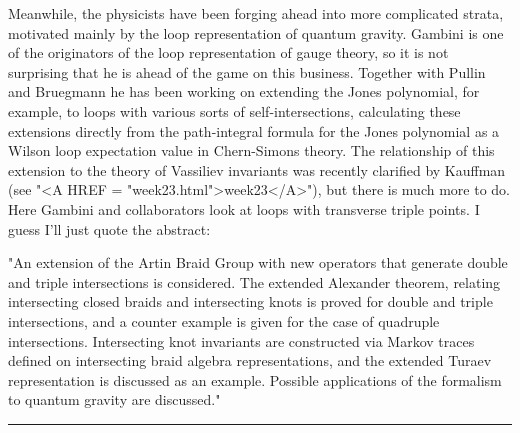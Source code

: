 Meanwhile, the physicists have been forging ahead into more complicated
strata, motivated mainly by the loop representation of quantum gravity.
Gambini is one of the originators of the loop representation of gauge
theory, so it is not surprising that he is ahead of the game on this
business.  Together with Pullin and Bruegmann he has been working on
extending the Jones polynomial, for example, to loops with various sorts
of self-intersections, calculating these extensions directly from the
path-integral formula for the Jones polynomial as a Wilson loop
expectation value in Chern-Simons theory.  The relationship of this
extension to the theory of Vassiliev invariants was recently clarified
by Kauffman (see "<A HREF = "week23.html">week23</A>"), but there is much more to do.  Here Gambini
and collaborators look at loops with transverse triple points.  I guess
I'll just quote the abstract:

"An extension of the Artin Braid Group with new operators that generate
double and triple intersections is considered. The extended Alexander
theorem, relating intersecting closed braids and intersecting knots is
proved for double and triple intersections, and a counter example is
given for the case of quadruple intersections. Intersecting knot
invariants are constructed via Markov traces defined on intersecting
braid algebra representations, and the extended Turaev representation is
discussed as an example. Possible applications of the formalism to
quantum gravity are discussed."
\par\noindent\rule{\textwidth}{0.4pt}

